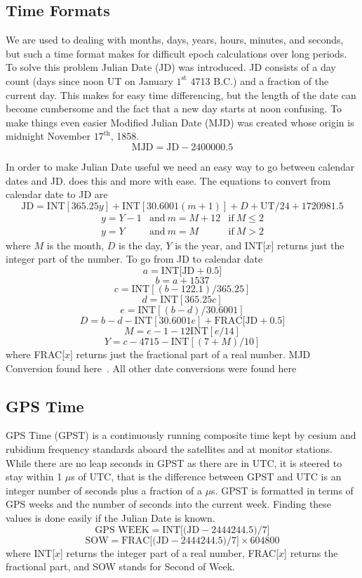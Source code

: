 \subsection{Time Formats}
We are used to dealing with months, days, years, hours, minutes, and seconds, but such a time format makes for difficult epoch calculations over long periods. To solve this problem Julian Date (JD) was introduced. JD consists of a day count (days since noon UT on January $1^{\mbox{st}}$ 4713 B.C.) and a fraction of the current day. This makes for easy time differencing, but the length of the date can become cumbersome and the fact that a new day starts at noon confusing. To make things even easier Modified Julian Date (MJD) was created whose origin is midnight November $17^{\mbox{th}}$, 1858.
\[ \mbox{MJD}=\mbox{JD}-2400000.5\]

In order to make Julian Date useful we need an easy way to go between calendar dates and JD.  does this and more with ease. The equations to convert from calendar date to JD are
\[ \mbox{JD}=\mbox{INT}[365.25y]+\mbox{INT}[30.6001(m+1)]+D+\mbox{UT}/24+1720981.5\]
\[ \begin{array}{lll}
y=Y-1 & \mbox{and}~m=M+12 & \mbox{if}~M \leq2 \\
y=Y & \mbox{and}~m=M & \mbox{if}~M > 2
\end{array} \]
where $M$ is the month, $D$ is the day, $Y$ is the year, and INT[$x$] returns just the integer part of the number. To go from JD to calendar date
\[ a=\mbox{INT[JD}+0.5] \]
\[ b=a+1537 \]
\[ c=\mbox{INT}[(b-122.1)/365.25] \]
\[ d=\mbox{INT}[365.25c] \]
\[ e=\mbox{INT}[(b-d)/30.6001] \]
\[ D=b-d-\mbox{INT}[30.6001e]+\mbox{FRAC[JD}+0.5] \]
\[ M=e-1-12\mbox{INT}[e/14] \]
\[ Y=c-4715-\mbox{INT}[(7+M)/10] \]
where FRAC[$x$] returns just the fractional part of a real number. MJD Conversion found here~\cite[p. 88]{me:gsmp}. All other date conversions were found here~\cite[pp. 36-37]{hlc:gtp}
\subsection{GPS Time}
GPS Time (GPST) is a continuously running composite time kept by cesium and rubidium frequency standards aboard the satellites and at monitor stations. While there are no leap seconds in GPST as there are in UTC, it is steered to stay within 1 $\mu$s of UTC, that is the difference between GPST and UTC is an integer number of seconds plus a fraction of a $\mu$s. GPST is formatted in terms of GPS weeks and the number of seconds into the current week. Finding these values is done easily if the Julian Date is known.
\[ \mbox{GPS WEEK}=\mbox{INT[(JD}-2444244.5)/7] \]
\[ \mbox{SOW}=\mbox{FRAC[(JD}-2444244.5)/7]\times 604800 \]
where INT[$x$] returns the integer part of a real number, FRAC[$x$] returns the fractional part, and SOW stands for Second of Week.

